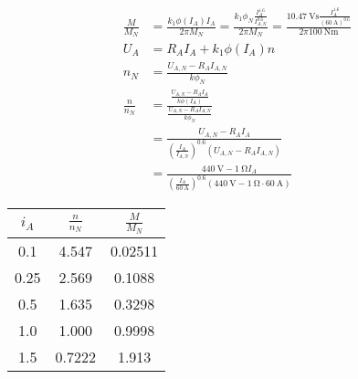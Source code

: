 \documentclass[11pt,a4paper]{scrartcl}
\newcommand{\mybr}[1]{\left(#1\right)}
\newcommand{\0}{_{\mybr{0}}}
\newcommand{\1}{_{\mybr{1}}}
\newcommand{\2}{_{\mybr{2}}}
\begin{document}
\subsection{}
\begin{align}
\frac{M}{M_N}&=\frac{k_1\phi\mybr{I_A}I_A}{2\pi M_N}=\frac{k_1\phi_N\frac{I_A^{\num{1.6}}}{I_{A,N}^{\num{0.6}}}}{2\pi M_N}=\frac{\SI{10.47}{\volt\second}\frac{I_A^{\num{1.6}}}{\mybr{\SI{60}{\ampere}}^{\num{0.6}}}}{2\pi\SI{100}{\newton\metre}}\\
U_A&=R_A I_A + k_1 \phi\mybr{I_A} n\\
n_N&=\frac{U_{A,N}-R_A I_{A,N}}{k\phi_N}\\
\frac{n}{n_N}&=\frac{\frac{U_{A,N}-R_A I_A}{k\phi\mybr{I_A}}}{\frac{U_{A,N}-R_A I_{A,N}}{k\phi_N}}\\
&=\frac{U_{A,N}-R_A I_A}{\mybr{\frac{I_A}{I_{A,N}}}^{\num{0.6}}\mybr{U_{A,N}-R_A I_{A,N}}}\\
&=\frac{\SI{440}{\volt}-\SI{1}{\ohm}I_A}{\mybr{\frac{I_A}{\SI{60}{\ampere}}}^{\num{0.6}}\mybr{\SI{440}{\volt}-\SI{1}{\ohm}\cdot\SI{60}{\ampere}}}
\end{align}
\begin{table}[htbp]
	\begin{center}
	\begin{tabular}{SSS}
		\toprule
		{$i_A$} & {$\frac{n}{n_N}$} & {$\frac{M}{M_N}$} \\
		 & 4.547 & 0.02511 \\
		0.25 & 2.569 & 0.1088 \\
		0.5 & 1.635 & 0.3298 \\
		1.0 & 1.000 & 0.9998 \\
		1.5 & 0.7222 & 1.913 \\
		\bottomrule
	\end{tabular}
	\end{center}
\end{table}
\begin{figure*}[!hp]
\centering
{}
\end{figure*}
\end{document}
